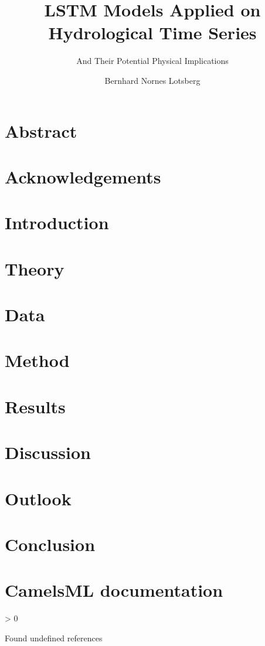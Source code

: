 \documentclass[11pt,a4paper,english, twoside]{report}
\title{LSTM Models Applied on Hydrological Time Series}
\subtitle{And Their Potential Physical Implications}
\author{Bernhard Nornes Lotsberg}
\newcounter{undefinedreferences}
\newcommand{\checkreferences}{
	\ifnum\value{undefinedreferences} > 0
	\begin{center}
	\begin{Huge}
	Found undefined references
	\end{Huge}
	\end{center}
	\else
	
	\fi
}
\begin{document}
\duoforside[
    dept={Department of Physics},
    program={Computational Science: physics},
    long]

%

\chapter*{Abstract}


\chapter*{Acknowledgements}


\tableofcontents
\printglossaries 
\listoffigures
\listoftables

\chapter{Introduction}


\newpage
\chapter{Theory}


\newpage
\chapter{Data}
\label{data}


\newpage
\chapter{Method}
\label{Data}


\newpage
\chapter{Results} 


\newpage
\chapter{Discussion}


\newpage
\chapter{Outlook}


\newpage
\chapter{Conclusion}




\newpage
\appendix
\chapter{CamelsML documentation}

\checkreferences
\end{document}
